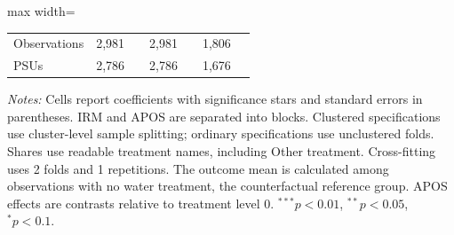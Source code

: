 \begin{table}[htbp]
\begin{adjustbox}{max width=\linewidth}
\begin{tabular}{lcccccc}
Observations & 2,981 &  & 2,981 &  & 1,806 &  \\
PSUs & 2,786 &  & 2,786 &  & 1,676 &  \\
\hline\hline
\end{tabular}
\end{adjustbox}
\par\vspace{3pt}
\begin{minipage}{\linewidth}\scriptsize \textit{Notes:} Cells report coefficients with significance stars and standard errors in parentheses. IRM and APOS are separated into blocks. Clustered specifications use cluster-level sample splitting; ordinary specifications use unclustered folds. Shares use readable treatment names, including Other treatment. Cross-fitting uses 2 folds and 1 repetitions. The outcome mean is calculated among observations with no water treatment, the counterfactual reference group. APOS effects are contrasts relative to treatment level 0. $^{***}p<0.01$, $^{**}p<0.05$, $^{*}p<0.1$.\end{minipage}
\end{table}